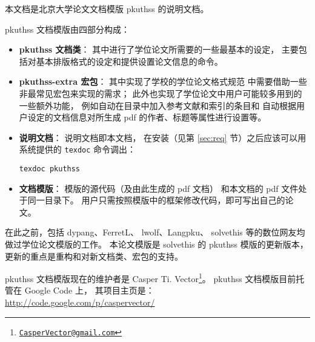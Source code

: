 %
%
%
%
%


本文档是北京大学论文文档模版 pkuthss 的说明文档。

pkuthss 文档模版由四部分构成：
\begin{itemize}
	\item \textbf{pkuthss 文档类}：
		其中进行了学位论文所需要的一些最基本的设定，
		主要包括对基本排版格式的设定和提供设置论文信息的命令。
	\item \textbf{pkuthss-extra 宏包}：
		其中实现了学校的学位论文格式规范\mbox{\supercite{pku-thesisstyle}}%
		中需要借助一些非最常见宏包来实现的需求；
		此外也实现了学位论文中用户可能较多用到的一些额外功能，
		例如自动在目录中加入参考文献和索引的条目和%
		自动根据用户设定的文档信息对所生成 pdf 的作者、标题等属性进行设置等。
	\item \textbf{说明文档}：
		说明文档即本文档，
		在安装（见第 \ref{sec:req} 节）之后应该可以用  系统提供的
		\verb|texdoc| 命令调出：
\begin{Verbatim}[frame = single]
texdoc pkuthss
\end{Verbatim}
	\item \textbf{文档模版}：
		模版的源代码（及由此生成的 pdf 文档）
		和本文档的 pdf 文件处于同一目录下。
		用户只需按照模版中的框架修改代码，即可写出自己的论文。
\end{itemize}

在此之前，包括 dypang\supercite{dypang}、FerretL\supercite{FerretL}、%
lwolf\supercite{lwolf}、Langpku\supercite{Langpku}、%
solvethis\supercite{solvethis} 等的数位网友均做过学位论文模版的工作。
本论文模版是 solvethis 的 pkuthss 模版的更新版本，
更新的重点是重构和对新文档类、宏包的支持。

pkuthss 文档模版现在的维护者是 Casper Ti. Vector\footnote%
{\href{mailto:CasperVector@gmail.com}{\texttt{CasperVector@gmail.com}}}。%
pkuthss 文档模版目前托管在 Google Code 上，
其项目主页是：\\
\hspace*{\parindent}\url{http://code.google.com/p/caspervector/}

